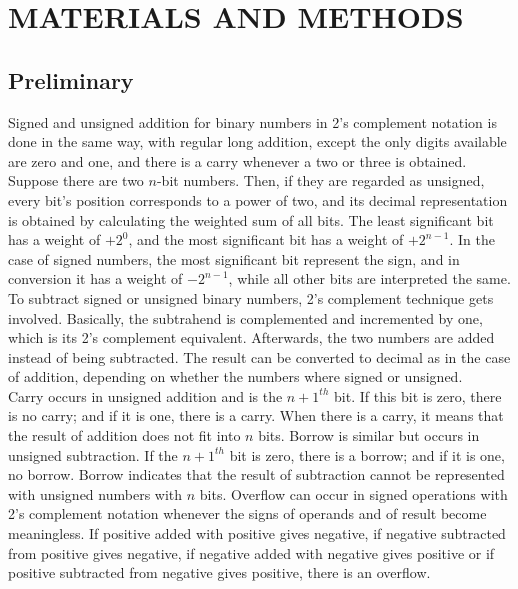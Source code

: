 \documentclass{article}
\begin{document}
\section{MATERIALS AND METHODS}

\subsection{Preliminary}
Signed and unsigned addition for binary numbers in 2's complement notation is done in the same way, with regular long addition, except the only digits available are zero and one, and there is a carry whenever a two or three is obtained. Suppose there are two $n$-bit numbers. Then, if they are regarded as unsigned, every bit's position corresponds to a power of two, and its decimal representation is obtained by calculating the weighted sum of all bits. The least significant bit has a weight of $+2^0$, and the most significant bit has a weight of $+2^{n-1}$. In the case of signed numbers, the most significant bit represent the sign, and in conversion it has a weight of $-2^{n-1}$, while all other bits are interpreted the same. \\

To subtract signed or unsigned binary numbers, 2's complement technique gets involved. Basically, the subtrahend is complemented and incremented by one, which is its 2's complement equivalent. Afterwards, the two numbers are added instead of being subtracted. The result can be converted to decimal as in the case of addition, depending on whether the numbers where signed or unsigned.\\

Carry occurs in unsigned addition and is the $n+1^{th}$ bit. If this bit is zero, there is no carry; and if it is one, there is a carry. When there is a carry, it means that the result of addition does not fit into $n$ bits. Borrow is similar but occurs in unsigned subtraction. If the $n+1^{th}$ bit is zero, there is a borrow; and if it is one, no borrow. Borrow indicates that the result of subtraction cannot be represented with unsigned numbers with $n$ bits. Overflow can occur in signed operations with 2's complement notation whenever the signs of operands and of result become meaningless. If positive added with positive gives negative, if negative subtracted from positive gives negative, if negative added with negative gives positive or if positive subtracted from negative gives positive, there is an overflow.\\ 
\end{document}
